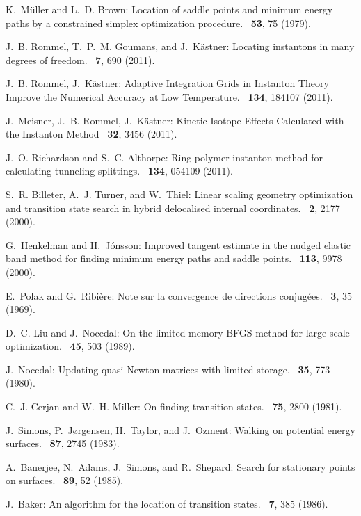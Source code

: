 \documentclass{article}
\begin{document}
\begin{thebibliography}{10}
K.~M{\"u}ller and L.~D. Brown:
\newblock Location of saddle points and minimum energy paths by a constrained
  simplex optimization procedure.
~{\bf 53}, 75  (1979).

J.~B. Rommel, T.~P.~M. Goumans, and J.~K\"astner:
\newblock Locating instantons in many degrees of freedom.
~{\bf 7}, 690  (2011).

J.~B. Rommel, J.~K\"astner:
\newblock Adaptive Integration Grids in Instanton Theory Improve the Numerical Accuracy at Low Temperature.
~{\bf 134}, 184107 (2011).

J.~Meisner, J.~B. Rommel, J.~K\"astner:
\newblock Kinetic Isotope Effects Calculated with the Instanton Method 
~{\bf 32}, 3456 (2011).

J.~O. Richardson and S.~C. Althorpe:
\newblock Ring-polymer instanton method for calculating tunneling splittings.
~{\bf 134}, 054109  (2011).

S.~R. Billeter, A.~J. Turner, and W.~Thiel:
\newblock Linear scaling geometry optimization and transition state search in
  hybrid delocalised internal coordinates.
~{\bf 2}, 2177  (2000).

G.~Henkelman and H.~J{\'o}nsson:
\newblock Improved tangent estimate in the nudged elastic band method for
  finding minimum energy paths and saddle points.
~{\bf 113}, 9978  (2000).

E.~Polak and G.~Ribi\`ere:
\newblock Note sur la convergence de directions conjug\'ees.
~{\bf 3}, 35  (1969).

D.~C. Liu and J.~Nocedal:
\newblock On the limited memory BFGS method for large scale optimization.
~{\bf 45}, 503  (1989).

J.~Nocedal:
\newblock Updating quasi-Newton matrices with limited storage.
~{\bf 35}, 773  (1980).

C.~J. Cerjan and W.~H. Miller:
\newblock On finding transition states.
~{\bf 75}, 2800  (1981).

J.~Simons, P.~J{\o}rgensen, H.~Taylor, and J.~Ozment:
\newblock Walking on potential energy surfaces.
~{\bf 87}, 2745  (1983).

A.~Banerjee, N.~Adams, J.~Simons, and R.~Shepard:
\newblock Search for stationary points on surfaces.
~{\bf 89}, 52  (1985).

J.~Baker:
\newblock An algorithm for the location of transition states.
~{\bf 7}, 385  (1986).

\end{thebibliography}
\end{document}
